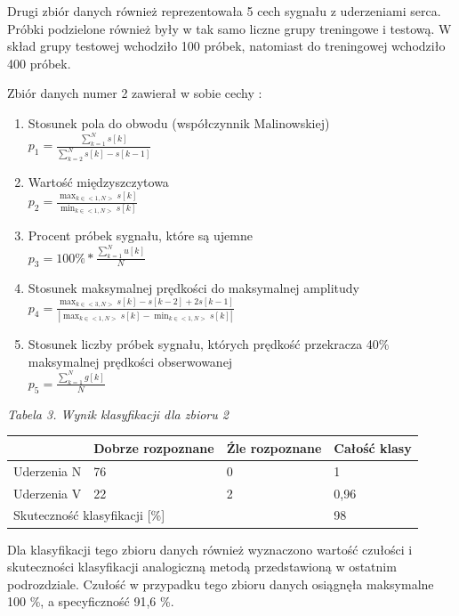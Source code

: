 \documentclass[[10pt,a4paper]{article}
\begin{document}
\begin{enumerate}
\begin{itemize}
\noindent Drugi zbiór danych również reprezentowała 5 cech sygnału z uderzeniami serca. Próbki podzielone również były w tak samo liczne grupy treningowe i testową. W skład grupy testowej wchodziło 100 próbek, natomiast do treningowej wchodziło 400 próbek.

\noindent Zbiór danych numer 2 zawierał w sobie cechy :

\begin{enumerate}
\item  Stosunek pola do obwodu (współczynnik Malinowskiej) 
 \\$p_1 = \frac{\sum_{k=1}^{N} s[k]}{\sum_{k=2}^{N} s[k]-s[k-1]}$

\item  Wartość międzyszczytowa
\\$p_2 = \frac{\max_{k \in <1,N>} s[k]}{\min_{k \in <1,N>} s[k]}$

\item  Procent próbek sygnału, które są ujemne    \\$p_3 = 100\% * \frac{\sum_{k=1}^{N} u[k]}{N}$ 

\item  Stosunek maksymalnej prędkości do maksymalnej amplitudy 
\\$p_4 = \frac{\max_{k \in <3,N>} s[k]-s[k-2]+2s[k-1]}{|\max_{k \in <1,N>} s[k] - \min_{k \in <1,N>} s[k]|}$

\item  Stosunek liczby próbek sygnału, których prędkość przekracza 40\% maksymalnej prędkości obserwowanej 
\\$p_5 = \frac{\sum_{k=1}^{N} g[k]}{N}$

\end{enumerate}
\textit{Tabela 3. Wynik klasyfikacji dla zbioru 2}
\newline
\begin{tabular}{|p{1.2in}|p{1.0in}|p{1.0in}|p{1.0in}|} \hline 
 & Dobrze rozpoznane & \'{Z}le rozpoznane & Całość klasy  \\ \hline 
Uderzenia N & 76 & 0 & 1 \\ \hline 
Uderzenia V & 22 & 2 & 0,96 \\ \hline 
\multicolumn{3}{|p{1in}|}{Skuteczność klasyfikacji [\%] } & 98 \\ \hline 
\end{tabular}



\noindent Dla klasyfikacji tego zbioru danych również wyznaczono wartość czułości i skuteczności klasyfikacji analogiczną metodą przedstawioną w ostatnim podrozdziale. Czułość w przypadku tego zbioru danych osiągnęła maksymalne 100 \%, a specyficzność 91,6 \%.


\end{itemize}
\end{enumerate}
\end{document}
